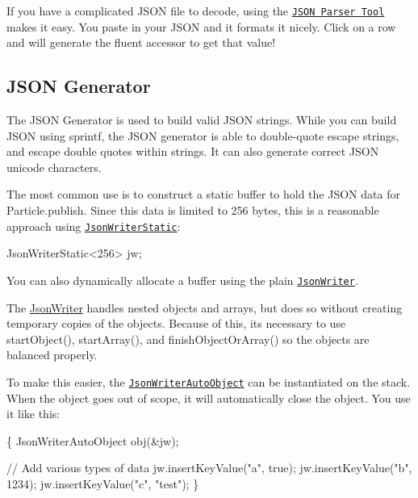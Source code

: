 If you have a complicated J\+S\+ON file to decode, using the \href{http://rickkas7.github.io/jsonparser/}{\tt J\+S\+ON Parser Tool} makes it easy. You paste in your J\+S\+ON and it formats it nicely. Click on a row and will generate the fluent accessor to get that value!

\subsection*{J\+S\+ON Generator}

The J\+S\+ON Generator is used to build valid J\+S\+ON strings. While you can build J\+S\+ON using sprintf, the J\+S\+ON generator is able to double-\/quote escape strings, and escape double quotes within strings. It can also generate correct J\+S\+ON unicode characters.

The most common use is to construct a static buffer to hold the J\+S\+ON data for Particle.\+publish. Since this data is limited to 256 bytes, this is a reasonable approach using \href{http://rickkas7.github.io/JsonParserGeneratorRK/class_json_writer_static.html}{\tt Json\+Writer\+Static}\+:


\begin{DoxyCode}
JsonWriterStatic<256> jw;
\end{DoxyCode}


You can also dynamically allocate a buffer using the plain \href{http://rickkas7.github.io/JsonParserGeneratorRK/class_json_writer.html}{\tt Json\+Writer}.

The \hyperlink{class_json_writer}{Json\+Writer} handles nested objects and arrays, but does so without creating temporary copies of the objects. Because of this, it\textquotesingle{}s necessary to use start\+Object(), start\+Array(), and finish\+Object\+Or\+Array() so the objects are balanced properly.

To make this easier, the \href{http://rickkas7.github.io/JsonParserGeneratorRK/class_json_writer_auto_object.html}{\tt Json\+Writer\+Auto\+Object} can be instantiated on the stack. When the object goes out of scope, it will automatically close the object. You use it like this\+:


\begin{DoxyCode}
\{
    JsonWriterAutoObject obj(&jw);

    // Add various types of data
    jw.insertKeyValue("a", true);
    jw.insertKeyValue("b", 1234);
    jw.insertKeyValue("c", "test");
\}
\end{DoxyCode}


